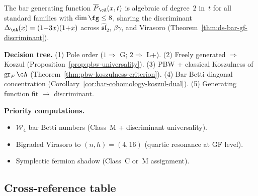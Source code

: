 The bar generating function $\overline{P}_\cA(x,t)$ is
algebraic of degree~$2$ in~$t$ for all standard families with
$\dim\fg \le 8$, sharing the discriminant
$\Delta_\cA(x) = (1{-}3x)(1{+}x)$
across $\widehat{\mathfrak{sl}}_2$, $\beta\gamma$, and
Virasoro (Theorem~\ref{thm:ds-bar-gf-discriminant}).

\smallskip\noindent\textbf{Decision tree.}\enspace
(1) Pole order ($1 \Rightarrow$ G; $2 \Rightarrow$ L+).
(2) Freely generated $\Rightarrow$ Koszul (Proposition~\ref{prop:pbw-universality}).
(3) PBW + classical Koszulness of $\operatorname{gr}_F\cA$ (Theorem~\ref{thm:pbw-koszulness-criterion}).
(4) Bar Betti diagonal concentration (Corollary~\ref{cor:bar-cohomology-koszul-dual}).
(5) Generating function fit $\to$ discriminant.

\smallskip\noindent\textbf{Priority computations.}
\begin{itemize}[nosep]
\item $\mathcal{W}_4$ bar Betti numbers (Class~M + discriminant universality).
\item Bigraded Virasoro to $(n,h)=(4,16)$ (quartic resonance at GF level).
\item Symplectic fermion shadow (Class~C or~M assignment).
\end{itemize}


\subsection{Cross-reference table}
\label{subsec:concordance-koszulness-xref}

